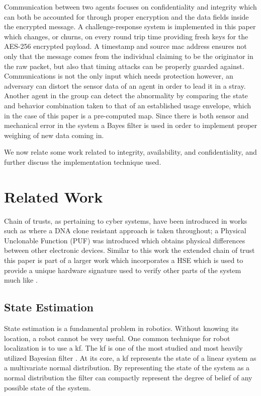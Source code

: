 \documentclass[conference]{IEEEtran}
\begin{document}
Communication between two agents focuses on confidentiality and integrity which can both be accounted for through proper encryption and the data fields inside the encrypted message. A challenge-response system is implemented in this paper which changes, or churns, on every round trip time providing fresh keys for the AES-256 encrypted payload. A timestamp and source mac address ensures not only that the message comes from the individual claiming to be the originator in the raw packet, but also that timing attacks can be properly guarded against. Communications is not the only input which needs protection however, an adversary can distort the sensor data of an agent in order to lead it in a stray. Another agent in the group can detect the abnormality by comparing the state and behavior combination taken to that of an established usage envelope, which in the case of this paper is a pre-computed map. Since there is both sensor and mechanical error in the system a Bayes filter is used in order to implement proper weighing of new data coming in. 

We now relate some work related to integrity, availability, and confidentiality, and further discuss the implementation technique used. 

\section{Related Work}
Chain of trusts, as pertaining to cyber systems, have been introduced in works such as \cite{adi2009mechatronic} where a DNA clone resistant approach is taken throughout; a Physical Unclonable Function (PUF) was introduced which obtains physical differences between other electronic devices. Similar to this work the extended chain of trust this paper is part of a larger work which incorporates a HSE which is used to provide a unique hardware signature used to verify other parts of the system much like \cite{adi2009mechatronic}.

\subsection{State Estimation}
State estimation is a fundamental problem in robotics. Without knowing its location, a robot cannot be very useful. One common technique for robot localization is to use a \gls{kf}. The \gls{kf} is one of the most studied and most heavily utilized Bayesian filter \cite[39-81]{ProbabilisticRobotics}. At its core, a \gls{kf} represents the state of a linear system as a multivariate normal distribution. By representing the state of the system as a normal distribution the filter can compactly represent the degree of belief of any possible state of the system.
\end{document}
